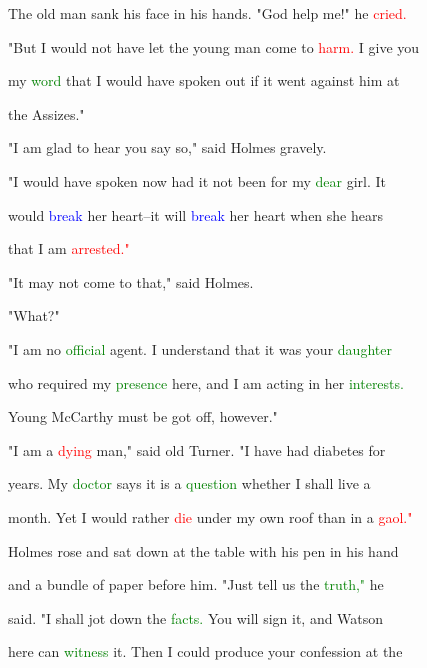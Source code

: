  The old man sank his face in his hands. \textcolor{BurntOrange}{"God} help me!" he \textcolor{red}{cried.}

 "But I would not have let the \textcolor{BurntOrange}{young} man come to \textcolor{red}{harm.} I give you

 my \textcolor{green}{word} that I would have spoken out if it went against him at

 the Assizes."



 "I am \textcolor{BurntOrange}{glad} to hear you say so," said Holmes gravely.



 "I would have spoken now had it not been for my \textcolor{green}{dear} girl. It

 would \textcolor{blue}{break} her heart--it will \textcolor{blue}{break} her heart when she hears

 that I am \textcolor{red}{arrested."}



 "It may not come to that," said Holmes.



 "What?"



 "I am no \textcolor{green}{official} agent. I understand that it was your \textcolor{green}{daughter}

 who required my \textcolor{green}{presence} here, and I am acting in her \textcolor{green}{interests.}

 \textcolor{BurntOrange}{Young} McCarthy must be got off, however."



 "I am a \textcolor{red}{dying} man," said old Turner. "I have had diabetes for

 years. My \textcolor{green}{doctor} says it is a \textcolor{green}{question} whether I shall live a

 month. Yet I would rather \textcolor{red}{die} under my own roof than in a \textcolor{red}{gaol."}



 Holmes rose and sat down at the table with his pen in his hand

 and a bundle of paper before him. "Just tell us the \textcolor{green}{truth,"} he

 said. "I shall jot down the \textcolor{green}{facts.} You will sign it, and Watson

 here can \textcolor{green}{witness} it. Then I could produce your \textcolor{BurntOrange}{confession} at the

